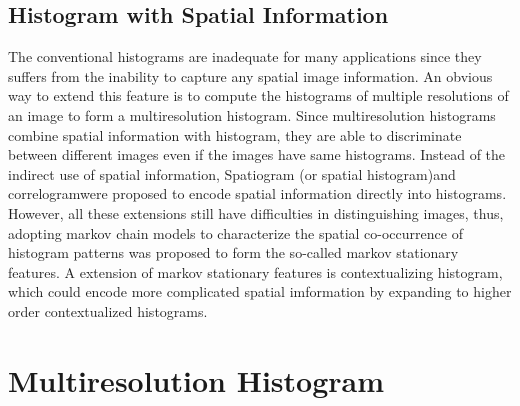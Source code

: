 \documentclass{article}
\begin{document}
\subsection{Histogram with Spatial Information}
The conventional histograms are inadequate for many applications since they suffers from the inability to capture any spatial image information. An obvious way to extend this feature is to compute the histograms of multiple resolutions of an image to form a multiresolution histogram. Since multiresolution histograms combine spatial information with histogram, they are able to discriminate between different images even if the images have same histograms\cite{Hadjidemetriou2001,Hadjidemetriou2004}. Instead of the indirect use of spatial information, Spatiogram (or spatial histogram)\cite{Birchfield2005}and correlogram\cite{Huang}were proposed to encode spatial information directly into histograms. However, all these extensions still have difficulties in distinguishing images, thus, adopting markov chain models to characterize the spatial co-occurrence of histogram patterns was proposed to form the so-called markov stationary features\cite{Li2008}. A extension of markov stationary features is contextualizing histogram, which could encode more complicated spatial imformation by expanding to higher order contextualized histograms\cite{Kassim2009,Feng2012}. 
\section{Multiresolution Histogram}


\end{document}

